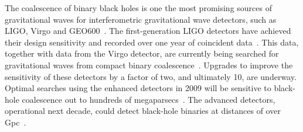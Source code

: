 

The coalescence of binary black holes is one the most promising
sources of gravitational waves for interferometric gravitational wave
detectors, such as LIGO, Virgo and GEO600~\cite{thorne.k:1987}. The
first-generation LIGO detectors have achieved their design sensitivity
and recorded over one year of coincident data~\cite{Abbott:2007kva}.
This data, together with data from the Virgo detector, are currently
being searched for gravitational waves from compact binary
coalescence~\cite{Abbott:2003pj,Abbott:2005pe,Abbott:2005pf,%
  Abbott:2007xi,Abbott:2007ai,Abbott:2008}.  Upgrades to improve the sensitivity
of these detectors by a factor of two, and ultimately 10, are
underway.  Optimal searches using the enhanced detectors in 2009 will
be sensitive to black-hole coalescence out to hundreds of
megaparsecs~\cite{LIGOEnhancedLIGO}. The advanced detectors,
operational next decade, could detect black-hole binaries at distances
of over \unit[1]{Gpc}~\cite{Fritschel:2003qw}.

